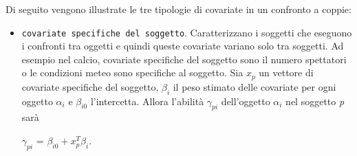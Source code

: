 Di seguito vengono illustrate le tre tipologie di covariate in un confronto a coppie:
\begin{itemize}
	\item \texttt{covariate specifiche del soggetto}. Caratterizzano i soggetti che eseguono i confronti tra oggetti e quindi queste covariate variano solo tra soggetti. Ad esempio nel calcio, covariate specifiche del soggetto sono il numero spettatori o le condizioni meteo sono specifiche al soggetto. Sia $x_p$ un vettore di covariate specifiche del soggetto, $\beta_i$ il peso stimato delle covariate per ogni oggetto $\alpha_{i}$ e $\beta_{i0}$ l'intercetta. Allora l'abilità $\gamma_{pi}$ dell'oggetto $\alpha_{i}$ nel soggetto \emph{p} sarà
	\begin{center}
		$ \gamma_{pi}$ = $\beta_{i0} + x^{T}_{p}\beta_i$.
	\end{center}


\end{itemize}
